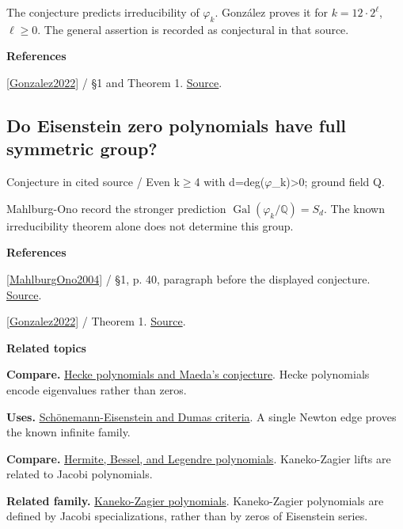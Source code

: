 \documentclass[11pt,a4paper,oneside,openany]{book}
\newenvironment{sources}{\par\smallskip\begingroup\footnotesize\color{atlasgray}\leftskip=10pt\setlength{\parskip}{2pt}}{\par\endgroup\smallskip}
\begin{document}
\color{black} The conjecture predicts irreducibility of \(\varphi_k\). González proves it for \(k=12\cdot2^\ell\), \(\ell\ge0\). The general assertion is recorded as conjectural in that source.\par
\begin{sources}
\textbf{References}\par\smallskip
\noindent\hyperlink{ref:Gonzalez2022}{[Gonzalez2022]} / §1 and Theorem 1.  \href{https://link.springer.com/article/10.1007/s00013-022-01766-6}{Source}.\par
\end{sources}\color{black}
\subsection*{Do Eisenstein zero polynomials have full symmetric group?}
{\small\sffamily\color{atlasgold}Conjecture in cited source / Even k\ensuremath{\ge}4 with d=deg(\ensuremath{\varphi}\_\allowbreak{}k)>0; ground field Q.}\par\smallskip
\color{black} Mahlburg-Ono record the stronger prediction \(\operatorname{Gal}(\varphi_k/\mathbb Q)=S_d\). The known irreducibility theorem alone does not determine this group.\par
\begin{sources}
\textbf{References}\par\smallskip
\noindent\hyperlink{ref:MahlburgOno2004}{[MahlburgOno2004]} / §1, p. 40, paragraph before the displayed conjecture.  \href{https://doi.org/10.4064/aa113-1-4}{Source}.\par
\noindent\hyperlink{ref:Gonzalez2022}{[Gonzalez2022]} / Theorem 1.  \href{https://link.springer.com/article/10.1007/s00013-022-01766-6}{Source}.\par
\end{sources}\color{black}
\par\medskip\begingroup\footnotesize\setlength{\parskip}{1pt}\textbf{\sffamily\color{atlasgreen}Related topics}\par
\color{black}\textbf{Compare.} \hyperlink{article:hecke-polynomials}{Hecke polynomials and Maeda's conjecture}. Hecke polynomials encode eigenvalues rather than zeros.\par
\color{black}\textbf{Uses.} \hyperlink{article:eisenstein-dumas}{Schönemann-Eisenstein and Dumas criteria}. A single Newton edge proves the known infinite family.\par
\color{black}\textbf{Compare.} \hyperlink{article:orthogonal-families}{Hermite, Bessel, and Legendre polynomials}. Kaneko-Zagier lifts are related to Jacobi polynomials.\par
\color{black}\textbf{Related family.} \hyperlink{article:kaneko-zagier}{Kaneko-Zagier polynomials}. Kaneko-Zagier polynomials are defined by Jacobi specializations, rather than by zeros of Eisenstein series.\par
\endgroup
\end{document}
